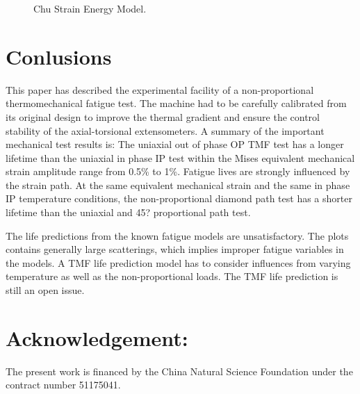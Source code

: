 \documentclass[preprint,5p,twocolumn,11pt,sort&compress]{elsarticle}
\begin{document}
\begin{figure}[!htp]
\caption{Chu Strain Energy Model.}
\label{Fig:NF-NP-Chu}
\end{figure}

\section{Conlusions}
This paper has described the experimental facility of a non-proportional thermomechanical fatigue test. The machine had to be carefully calibrated from its original design to improve the thermal gradient and ensure the control stability of the axial-torsional extensometers.
A summary of the important mechanical test results is:
The uniaxial out of phase OP TMF test has a longer lifetime than the uniaxial in phase IP test within the Mises equivalent mechanical strain amplitude range from 0.5\% to 1\%.
Fatigue lives are strongly influenced by the strain path. At the same equivalent mechanical strain and the same in phase IP temperature conditions, the non-proportional diamond path test has a shorter lifetime than the uniaxial and 45? proportional path test.

The life predictions from the known fatigue models are unsatisfactory. The plots contains generally large scatterings, which implies improper fatigue variables in the models.
A TMF life prediction model has to consider influences from varying temperature as well as the non-proportional loads. The TMF life prediction is still an open issue.






\section*{Acknowledgement:} The present work is financed by the China Natural Science Foundation under the contract number 51175041.


\end{document}
